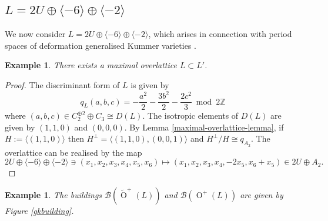 \documentclass[12pt, a4paper]{article}
\newtheorem{example}[theorem]{Example}
\newcommand{\ZZ}{\mathbb{Z}}
\newcommand{\la}{\langle}
\newcommand{\ra}{\rangle}
\newcommand{\beq}{\begin{equation*}}
\newcommand{\eeq}{\end{equation*}}
\newcommand{\bc}{\mathcal{B}}
\newcommand{\opn}{\operatorname}
\newcommand{\op}{\oplus}
\begin{document}
\subsection{$L=2U \op \la -6 \ra \op \la - 2 \ra$}
We now consider $L=2U \op \la -6 \ra \op \la - 2 \ra$, which arises in connection with period spaces of deformation generalised Kummer varieties \cite{DawesFamily}.
\begin{example}\label{MaximalLatticeExample}
  There exists a maximal overlattice $L \subset L'$.
\end{example}
\begin{proof}
  The discriminant form of $L$ is given by
  \beq
  q_L(a,b,c) =
  -\frac{a^2}{2}
  -\frac{3b^2}{2}
  -\frac{2c^2}{3} \bmod{2 \ZZ}
  \eeq
  where $(a,b,c) \in C_2^{\op 2} \op C_3 \cong D(L)$.
  The isotropic elements of $D(L)$ are given by $(1,1,0)$ and $(0,0,0)$.
  By Lemma \ref{maximal-overlattice-lemma},
  if $H := \la (1,1,0) \ra$ then $H^{\perp} = \la (1,1,0), (0,0,1) \ra$ and $H^{\perp}/H \cong q_{A_2}$.
  The overlattice can be realised by the map 
  \beq
  2U \op \la -6 \ra \op \la -2 \ra \ni
  (x_1, x_2, x_3, x_4, x_5, x_6) \mapsto
  (x_1, x_2, x_3, x_4, -2 x_5, x_6 + x_5)
  \in 2U \op A_2.
  \eeq
\end{proof}
\begin{example}
  The buildings $\bc(\widetilde{\opn{O}}^+(L))$ and $\bc(\opn{O}^+(L))$ are given by Figure \ref{gkbuilding}.
\end{example}
\end{document}
